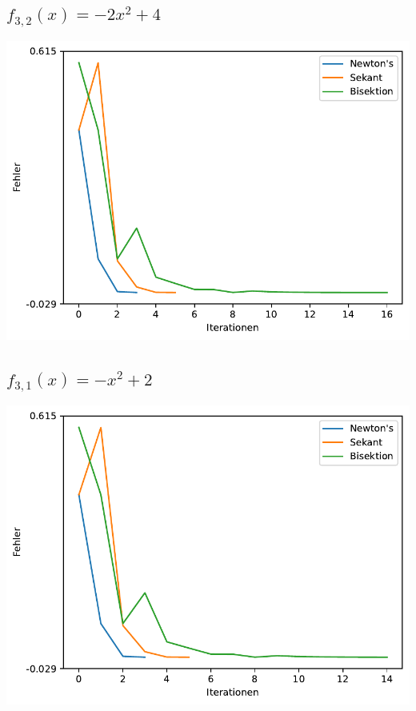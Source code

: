 \documentclass[10pt]{scrartcl}
\newcommand{\1}{1\hspace{-0,9ex}1}
\begin{document}
	\subsection*{$f_{3,2}(x) = -2x^2 + 4$}
	\includegraphics[width=\textwidth]{plots/plot2.pdf}
	\subsection*{$f_{3,1}(x) = -x^2 + 2$}
	\includegraphics[width=\textwidth]{plots/plot3.pdf}
\end{document}
